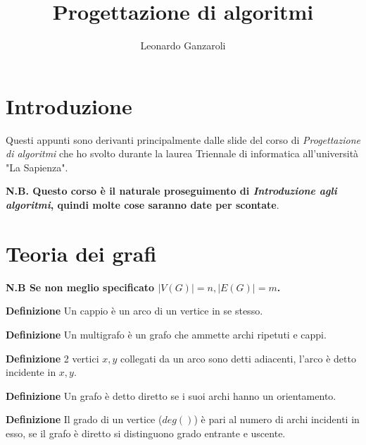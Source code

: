 \documentclass{article}
\title{Progettazione di algoritmi}
\author{Leonardo Ganzaroli}
\date{}
\begin{document}
\maketitle


\tableofcontents

\hypersetup{allcolors=black}

\newpage

\section*{Introduzione}

Questi appunti sono derivanti principalmente dalle slide del corso di \textit{Progettazione di algoritmi} che ho svolto durante la laurea Triennale di informatica all'università "La Sapienza".

\noindent \textbf{N.B. Questo corso è il naturale proseguimento di \textit{Introduzione agli algoritmi}, quindi molte cose saranno date per scontate}.

\newpage

\section{Teoria dei grafi}

\textbf{N.B Se non meglio specificato $|V(G)|=n,|E(G)|=m$.}\newline

\noindent\textbf{Definizione} Un cappio è un arco di un vertice in se stesso.\newline

\noindent\textbf{Definizione} Un multigrafo è un grafo che ammette archi ripetuti e cappi.\newline

\noindent\textbf{Definizione} 2 vertici $x,y$ collegati da un arco sono detti adiacenti, l'arco è detto incidente in $x,y$.\newline

\noindent\textbf{Definizione} Un grafo è detto diretto se i suoi archi hanno un orientamento.\newline

\noindent\textbf{Definizione} Il grado di un vertice ($deg()$) è pari al numero di archi incidenti in esso, se il grafo è diretto si distinguono grado entrante e uscente.\newline
\end{document}
